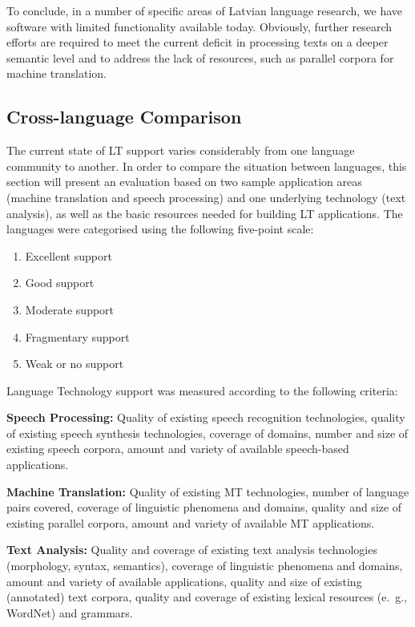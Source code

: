 \begin{multicols}{2}
To conclude, in a number of specific areas of Latvian language research, we have software with limited functionality available today.
Obviously, further research efforts are required to meet the current deficit in processing texts on a deeper semantic level and to address the lack of resources, such as parallel corpora for machine translation. 

\subsection{Cross-language Comparison}

The current state of LT support varies considerably from one language community to another.
In order to compare the situation between languages, this section will present an evaluation based on two sample application areas (machine translation and speech processing) and one underlying technology (text analysis), as well as the basic resources needed for building LT applications.
The languages were categorised using the following five-point scale:

\begin{enumerate}
\item Excellent support
\item Good support
\item Moderate support
\item Fragmentary support
\item Weak or no support
\end{enumerate}

Language Technology support was measured according to the following criteria:

\textbf{Speech Processing:} Quality of existing speech recognition technologies, quality of existing speech synthesis technologies, coverage of domains, number and size of existing speech corpora, amount and variety of available speech-based applications.

\textbf{Machine Translation:} Quality of existing MT technologies, number of language pairs covered, coverage of linguistic phenomena and domains, quality and size of existing parallel corpora, amount and variety of available MT applications.

\textbf{Text Analysis:} Quality and coverage of existing text analysis technologies (morphology, syntax, semantics), coverage of linguistic phenomena and domains, amount and variety of available applications, quality and size of existing (annotated) text corpora, quality and coverage of existing lexical resources (e.~g., WordNet) and grammars.


\end{multicols}
